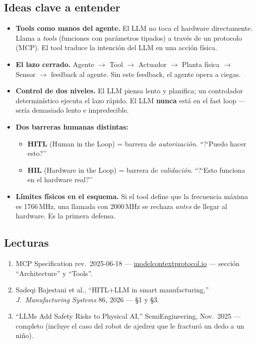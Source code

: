 \documentclass[11pt,a4paper]{article}
\begin{document}
\subsection{Ideas clave a entender}
\begin{itemize}
  \item \textbf{Tools como manos del agente.} El LLM no toca el hardware directamente. Llama a \textit{tools} (funciones con par\'ametros tipados) a trav\'es de un protocolo (MCP). El tool traduce la intenci\'on del LLM en una acci\'on f\'isica.
  \item \textbf{El lazo cerrado.} Agente $\to$ Tool $\to$ Actuador $\to$ Planta f\'isica $\to$ Sensor $\to$ feedback al agente. Sin este feedback, el agente opera a ciegas.
  \item \textbf{Control de dos niveles.} El LLM piensa lento y planifica; un controlador determin\'istico ejecuta el lazo r\'apido. El LLM \textbf{nunca} est\'a en el fast loop --- ser\'ia demasiado lento e impredecible.
  \item \textbf{Dos barreras humanas distintas:}
    \begin{itemize}
      \item \textbf{HITL} (Human in the Loop) = barrera de \textit{autorizaci\'on}. ``?`Puedo hacer esto?''
      \item \textbf{HIL} (Hardware in the Loop) = barrera de \textit{validaci\'on}. ``?`Esto funciona en el hardware real?''
    \end{itemize}
  \item \textbf{L\'imites f\'isicos en el esquema.} Si el tool define que la frecuencia m\'axima es 1766\,MHz, una llamada con 2000\,MHz se rechaza \textit{antes} de llegar al hardware. Es la primera defensa.
\end{itemize}

\subsection{Lecturas}
\begin{enumerate}[label=\textbf{L\arabic*.}]
  \item MCP Specification rev.\ 2025-06-18 --- \url{modelcontextprotocol.io} --- secci\'on ``Architecture'' y ``Tools''.
  \item Sadeqi Bajestani et al., ``HITL+LLM in smart manufacturing,'' \textit{J.\ Manufacturing Systems} 86, 2026 --- \S1 y \S3.
  \item ``LLMs Add Safety Risks to Physical AI,'' SemiEngineering, Nov.\ 2025 --- completo (incluye el caso del robot de ajedrez que le fractur\'o un dedo a un ni\~no).
\end{enumerate}
\end{document}
